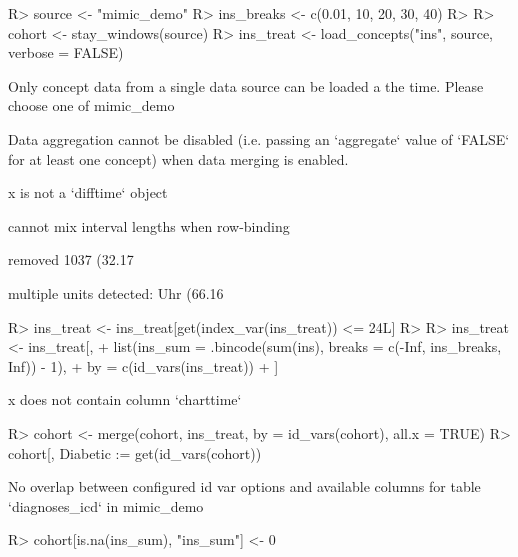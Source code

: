 \documentclass[
]{jss}
\begin{document}
\begin{CodeChunk}

\begin{CodeInput}
R> source <- "mimic_demo"
R> ins_breaks <- c(0.01, 10, 20, 30, 40)
R> 
R> cohort <- stay_windows(source)
R> ins_treat <- load_concepts("ins", source, verbose = FALSE)
\end{CodeInput}

\begin{CodeOutput}
Only concept data from a single data source can be loaded a the time. Please
choose one of mimic_demo
\end{CodeOutput}

\begin{CodeOutput}
Data aggregation cannot be disabled (i.e. passing an `aggregate` value of
`FALSE` for at least one concept) when data merging is enabled.
\end{CodeOutput}

\begin{CodeOutput}
x is not a `difftime` object
\end{CodeOutput}

\begin{CodeOutput}
cannot mix interval lengths when row-binding
\end{CodeOutput}

\begin{CodeOutput}
removed 1037 (32.17%
\end{CodeOutput}

\begin{CodeOutput}
multiple units detected: Uhr (66.16%
\end{CodeOutput}

\begin{CodeInput}
R> ins_treat <- ins_treat[get(index_var(ins_treat)) <= 24L]
R> 
R> ins_treat <- ins_treat[,
+   list(ins_sum = .bincode(sum(ins), breaks = c(-Inf, ins_breaks, Inf)) - 1),
+   by = c(id_vars(ins_treat))
+ ]
\end{CodeInput}

\begin{CodeOutput}
x does not contain column `charttime`
\end{CodeOutput}

\begin{CodeInput}
R> cohort <- merge(cohort, ins_treat, by = id_vars(cohort), all.x = TRUE)
R> cohort[, Diabetic := get(id_vars(cohort)) %
\end{CodeInput}

\begin{CodeOutput}
No overlap between configured id var options and available columns for table
`diagnoses_icd` in mimic_demo
\end{CodeOutput}

\begin{CodeInput}
R> cohort[is.na(ins_sum), "ins_sum"] <- 0
\end{CodeInput}
\end{CodeChunk}
\end{document}
